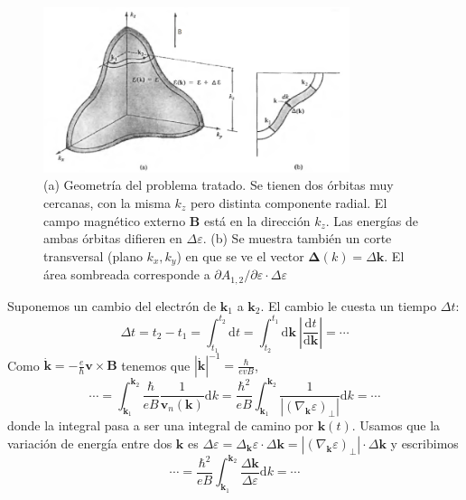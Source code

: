 \begin{figure}
  \centering
  \includegraphics[width=0.8\textwidth]{figures/orbitgeom.png}
  \caption{(a) Geometría del problema tratado. Se tienen dos órbitas
    muy cercanas, con la misma $k_z$ pero distinta componente
    radial. El campo magnético externo $\mathbf{B}$ está en la
    dirección $k_z$. Las energías de ambas órbitas difieren en
    $\Delta \varepsilon$. (b) Se muestra también un corte transversal
    (plano $k_x, k_y$) en que se ve el vector
    $\boldsymbol{\Delta}(k) = \Delta \mathbf{k}$. El área sombreada
    corresponde a
    $\partial A_{1,2} / \partial \varepsilon \cdot \Delta
    \varepsilon$}
  \label{fig:orbitgeom}
\end{figure}

Suponemos un cambio del electrón de $\mathbf{k}_1$ a
$\mathbf{k}_2$. El cambio le cuesta un tiempo $\Delta t$:
\begin{equation}
  \Delta t = t_2 -t_1 = \int_{t_1}^{t_2} \text{d}t = \int_{t_2}^{t_1}
  \text{d}\mathbf{k}\  \left| \frac{\text{d}t}{\text{d}\mathbf{k}}
  \right| = \cdots
\end{equation}
Como $\dot{\mathbf{k}} = - \frac{e}{\hbar} \mathbf{v} \times
\mathbf{B}$ tenemos que $|\dot{\mathbf{k}}|^{-1} = \frac{\hbar}{evB}$,
    \begin{equation}
      \cdots =  \int_{\mathbf{k}_1}^{\mathbf{k}_2} \frac{\hbar}{eB}
      \frac{1}{\mathbf{v}_n(\mathbf{k})}\text{d}k =\frac{\hbar^2}{eB} \int_{\mathbf{k}_1}^{\mathbf{k}_2}
      \frac{1}{ \left| (\nabla_\mathbf{k}\varepsilon)_\perp\right|}\text{d}k = \cdots
    \end{equation}
donde la integral pasa a ser una integral de camino por
$\mathbf{k}(t)$. Usamos que la variación de energía entre dos $\mathbf{k}$ es $\Delta
\varepsilon = \Delta_\mathbf{k}\varepsilon\cdot\Delta \mathbf{k} =
|(\nabla_\mathbf{k}\varepsilon)_\perp|\cdot\Delta \mathbf{k}$ y
escribimos
\begin{equation}
  \cdots = \frac{\hbar^2}{eB} \int_{\mathbf{k}_1}^{\mathbf{k}_2}
  \frac{\Delta \mathbf{k}}{\Delta \varepsilon}\text{d}k = \cdots
\end{equation}

